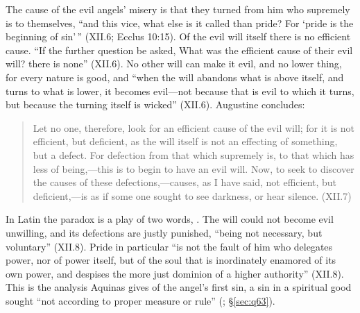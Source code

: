 The cause of the evil angels' misery is that they turned from him who
supremely is to themselves, ``and this vice, what else is it called than
pride? For `pride is the beginning of sin'\,'' (XII.6; Ecclus 10:15). Of
the evil will itself there is no efficient cause. ``If the further
question be asked, What was the efficient cause of their evil will? there
is none'' (XII.6). No other will can make it evil, and no lower thing,
for every nature is good, and ``when the will
abandons what is above itself, and turns to what is lower, it becomes
evil---not because that is evil to which it turns, but because the
turning itself is wicked'' (XII.6). Augustine concludes:
\begin{quote}
Let no one, therefore, look for an efficient cause of the evil will; for
it is not efficient, but deficient, as the will itself is not an effecting
of something, but a defect. For defection from that which supremely is,
to that which has less of being,---this is to begin to have an evil will.
Now, to seek to discover the causes of these defections,---causes, as I
have said, not efficient, but deficient,---is as if some one sought to
see darkness, or hear silence. (XII.7)
\end{quote}
In Latin the paradox is a play of two words, . The will could
not become evil unwilling, and its defections are justly punished,
``being not necessary, but voluntary'' (XII.8). Pride in particular ``is not the fault of him who delegates power, nor of power
itself, but of the soul that is inordinately enamored of its own power,
and despises the more just dominion of a higher authority'' (XII.8). This
is the analysis Aquinas gives of the angel's first sin, a sin in a
spiritual good sought ``not according to proper measure or rule'' (; \S\ref{sec:q63}).

